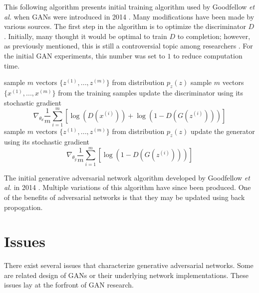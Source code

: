 \documentclass[11pt]{article}
\begin{document}
This following algorithm presents initial training algorithm used by Goodfellow \textit{et al.} when GANs were introduced in 2014 \citep{2014arXiv1406.2661G}. Many modifications have been made by various sources. The first step in the algorithm is to optimize the discriminator $D$. Initially, many thought it would be optimal to train $D$ to completion; however, as previously mentioned, this is still a controversial topic among researchers \citep{2017arXiv170100160G}. For the initial GAN experiments, this number was set to $1$ to reduce computation time.

\begin{algorithm}[H]
  \SetAlgoLined
   \linebreak
   \linebreak
   {
     {
      sample $m$ vectors $\{z^{(1)},...,z^{(m)}\}$ from distribution $p_z(z)$\;
      sample $m$ vectors $\{x^{(1)},...,x^{(m)}\}$ from the training samples\;
      update the discriminator using its stochastic gradient
      $$\nabla_{\theta_d}\frac{1}{m}\sum_{i=1}^{m}[\log(D(x^{(i)}))+\log(1-D(G(z^{(i)})))]$$
    }
    sample $m$ vectors $\{z^{(1)},...,z^{(m)}\}$ from distribution $p_z(z)$\;
    update the generator using its stochastic gradient\;
    $$\nabla_{\theta_g}\frac{1}{m}\sum_{i=1}^{m}[\log(1-D(G(z^{(i)})))]$$
  }
  \caption{The initial generative adversarial network algorithm developed by Goodfellow \textit{et al.} in 2014 \citep{2014arXiv1406.2661G}. Multiple variations of this algorithm have since been produced. One of the benefits of adversarial networks is that they may be updated using back propogation.}
\end{algorithm}

\section{Issues}
There exist several issues that characterize generative adversarial networks. Some are related design of GANs or their underlying network implementations. These issues lay at the forfront of GAN research.
\end{document}
